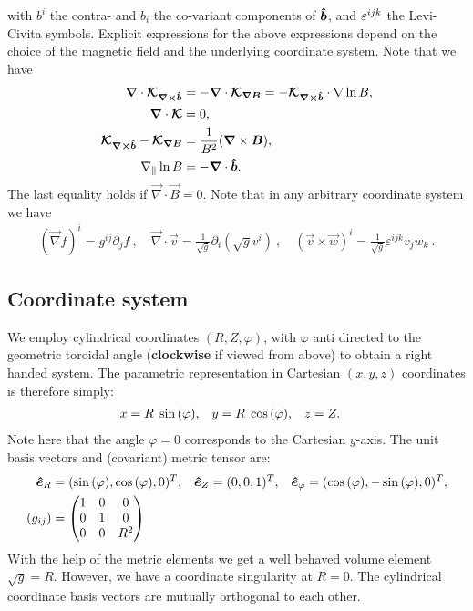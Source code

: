with $b^i$ the contra- and $b_i$ the co-variant components of $\bm{\hat{b}}$, and
$\varepsilon^{ijk}$ the Levi-Civita symbols.
Explicit expressions for the above expressions
depend on the choice of the magnetic field and the underlying coordinate system.
Note that we have
\begin{align}
    {\boldsymbol{\nabla}} \cdot {\boldsymbol{\mathcal K_{\nabla\times\bm{\hat{b}}}}}
    &= -{\boldsymbol{\nabla}} \cdot {\boldsymbol{\mathcal K_{\nabla B}}} = -{\boldsymbol{ \mathcal K_{\nabla\times\bm{\hat{b}}}}}\cdot\nabla\ln B, \\
    {\boldsymbol{\nabla}}\cdot{\boldsymbol{ \mathcal K}} &= 0, \\
    {\boldsymbol{ \mathcal K_{\nabla\times\bm{\hat{b}}}}} - {\boldsymbol{ \mathcal K_{\nabla B}}} &= \frac{1}{B^2} ({\boldsymbol{\nabla}} \times {\boldsymbol{B}}), \\
    \nabla_\parallel \ln B &= -{\boldsymbol{\nabla}}\cdot\bm{\hat{b}}.
    \label{eq:curl_curvature}
\end{align}
The last equality holds if $\vec\nabla\cdot \vec B = 0$.
Note that in any arbitrary coordinate system we have
\begin{align}
(\vec \nabla f)^i = g^{ij}\partial_j f ~, \quad
\vec \nabla \cdot \vec v = \frac{1}{\sqrt{g}}\partial_i \left(\sqrt{g} v^i\right) ~, \quad
(\vec v \times \vec w)^i = \frac{1}{\sqrt{g}}\varepsilon^{ijk} v_jw_k ~.
\end{align}

\subsection{Coordinate system}\label{sec:cylmetric}
We employ cylindrical coordinates \( (R,Z,\varphi) \), with \(\varphi\) anti directed to the geometric toroidal angle ({\bf clockwise} if viewed from above) to
obtain a right handed system. The parametric representation in Cartesian \((x,y,z)\) coordinates is therefore simply:
\begin{align}
 x &= R \hspace{1 mm} \sin{(\varphi)}, &
 y &= R \hspace{1 mm} \cos{(\varphi)}, &
 z &= Z .
\end{align}
Note here that the angle $\varphi = 0$ corresponds to the Cartesian $y$-axis.
The unit
basis vectors and (covariant) metric tensor are:
\begin{align}
 \bm{\hat{e}}_R      &= (\sin{(\varphi)} ,   \cos{(\varphi)},0)^T, &
 \bm{\hat{e}}_Z      &= ( 0 ,0 ,1 )^T, &
 \bm{\hat{e}}_{\varphi} &= ( \cos{(\varphi)} , -\sin{(\varphi)} , 0 )^T,
\\
    (g_{ij}) &= \begin{pmatrix}
  1 & 0 & 0 \\
  0 & 1 & 0 \\
  0 & 0 & R^2
   \end{pmatrix}
\end{align}
With the help of the metric elements we get a well behaved volume element \(\sqrt{g} = R\). However, we have a coordinate singularity at \(R=0\).
The cylindrical coordinate basis vectors are mutually orthogonal to each other.

